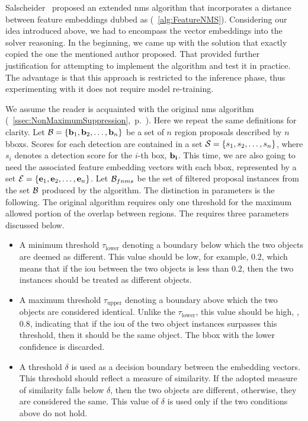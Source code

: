 Salscheider~\cite{salscheider2020featurenms} proposed an extended \gls{nms} algorithm that incorporates a distance between feature embeddings dubbed as \featurenms{} (\algtext{}~\ref{alg:FeatureNMS}). Considering our idea introduced above, we had to encompass the vector embeddings into the solver reasoning. In the beginning, we came up with the solution that exactly copied the one the mentioned author proposed. That provided further justification for attempting to implement the algorithm and test it in practice. The advantage is that this approach is restricted to the inference phase, thus experimenting with it does not require model re-training.

\def\threshlower{\tau_{\text{lower}}}
\def\threshupper{\tau_{\text{upper}}}
\def\threshsim{\delta}

We assume the reader is acquainted with the original \gls{nms} algorithm (\sectiontext{}~\ref{ssec:NonMaximumSuppression},~p.~\pageref{ssec:NonMaximumSuppression}). Here we repeat the same definitions for clarity. Let $\mathcal{B} = \left\{ {\mathbf{b}_1, \mathbf{b}_2, \dots, \mathbf{b}_n} \right\}$ be a set of $n$ region proposals described by $n$ \glspl{bbox}. Scores for each detection are contained in a set $\mathcal{S} = \left\{ {s_1, s_2, \dots, s_n} \right\}$, where $s_i$ denotes a detection score for the $i$-th box, $\mathbf{b_i}$. This time, we are also going to need the associated feature embedding vectors with each \gls{bbox}, represented by a set $\mathcal{E} = \left\{ {\mathbf{e}_1, \mathbf{e}_2, \dots, \mathbf{e}_n} \right\}$. Let $\mathcal{B}_{fnms}$ be  the set of filtered proposal instances from the set $\mathcal{B}$ produced by the \featurenms{} algorithm. The distinction in parameters is the following. The original algorithm requires only one threshold for the maximum allowed portion of the overlap between regions. The \featurenms{} requires three parameters discussed below.
\begin{itemize}
    \item A minimum threshold $\threshlower$ denoting a boundary below which the two objects are deemed as different. This value should be low, for example, $0.2$, which means that if the \gls{iou} between the two objects is less than $0.2$, then the two instances should be treated as different objects.
    \item A maximum threshold $\threshupper$ denoting a boundary above which the two objects are considered identical. Unlike the $\threshlower$, this value should be high, \egtext{}, $0.8$, indicating that if the \gls{iou} of the two object instances surpasses this threshold, then it should be the same object. The \gls{bbox} with the lower confidence is discarded.
    \item A threshold $\threshsim$ is used as a decision boundary between the embedding vectors. This threshold should reflect a measure of similarity. If the adopted measure of similarity falls below $\threshsim$, then the two objects are different, otherwise, they are considered the same. This value of $\threshsim$ is used only if the two conditions above do not hold.
\end{itemize}

